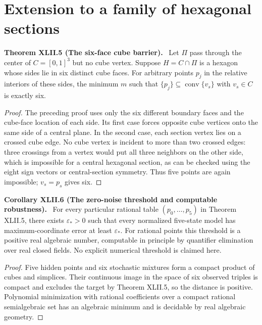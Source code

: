 \documentclass[11pt,a4paper,oneside]{book}
\newcommand{\statement}[3]{\par\medskip\noindent\textbf{#1 #2 (#3).}\ }
\begin{document}
\section{Extension to a family of hexagonal sections}
\statement{Theorem}{XLII.5}{The six-face cube barrier}
Let $\Pi$ pass through the center of $C=[0,1]^3$ but no cube vertex. Suppose $H=C\cap\Pi$ is a hexagon whose sides lie in six distinct cube faces. For arbitrary points $p_j$ in the relative interiors of these sides, the minimum $m$ such that $\{p_j\}\subseteq\operatorname{conv}\{v_s\}$ with $v_s\in C$ is exactly six.
\begin{proof}
The preceding proof uses only the six different boundary faces and the cube-face location of each side. Its first case forces opposite cube vertices onto the same side of a central plane. In the second case, each section vertex lies on a crossed cube edge. No cube vertex is incident to more than two crossed edges: three crossings from a vertex would put all three neighbors on the other side, which is impossible for a central hexagonal section, as can be checked using the eight sign vectors or central-section symmetry. Thus five points are again impossible; $v_s=p_s$ gives six.
\end{proof}
\statement{Corollary}{XLII.6}{The zero-noise threshold and computable robustness}
For every particular rational table $(p_0,\ldots,p_5)$ in Theorem XLII.5, there exists $\varepsilon_*>0$ such that every normalized five-state model has maximum-coordinate error at least $\varepsilon_*$. For rational points this threshold is a positive real algebraic number, computable in principle by quantifier elimination over real closed fields. No explicit numerical threshold is claimed here.
\begin{proof}
Five hidden points and six stochastic mixtures form a compact product of cubes and simplices. Their continuous image in the space of six observed triples is compact and excludes the target by Theorem XLII.5, so the distance is positive. Polynomial minimization with rational coefficients over a compact rational semialgebraic set has an algebraic minimum and is decidable by real algebraic geometry.
\end{proof}
\end{document}
